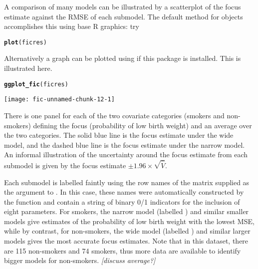 \documentclass[article,shortnames,nojss,nofooter]{jss}\usepackage[]{graphicx}\usepackage[]{color}
\makeatletter
\def\maxwidth{ %
  \ifdim\Gin@nat@width>\linewidth
    \linewidth
  \else
    \Gin@nat@width
  \fi
}
\newcommand{\hlstd}[1]{\textcolor[rgb]{0.345,0.345,0.345}{#1}}%
\newcommand{\hlkwd}[1]{\textcolor[rgb]{0.737,0.353,0.396}{\textbf{#1}}}%
\newenvironment{kframe}{%
 \def\at@end@of@kframe{}%
 \ifinner\ifhmode%
  \def\at@end@of@kframe{\end{minipage}}%
  \begin{minipage}{\columnwidth}%
 \fi\fi%
 \def\FrameCommand##1{\hskip\@totalleftmargin \hskip-\fboxsep
 \colorbox{shadecolor}{##1}\hskip-\fboxsep
     \hskip-\linewidth \hskip-\@totalleftmargin \hskip\columnwidth}%
 \MakeFramed {\advance\hsize-\width
   \@totalleftmargin\z@ \linewidth\hsize
   \@setminipage}}%
 {\par\unskip\endMakeFramed%
 \at@end@of@kframe}
\newenvironment{knitrout}{}{} %
\makeatother
\begin{document}
A comparison of many models can be illustrated by a scatterplot of
the focus estimate against the RMSE of each submodel.  The default
 method for  objects accomplishes this using base
R graphics: try 
\begin{knitrout}
\color{fgcolor}\begin{kframe}
\begin{alltt}
\hlkwd{plot}\hlstd{(ficres)}
\end{alltt}
\end{kframe}
\end{knitrout}
Alternatively a graph can be plotted using  if this
package is installed.   This is illustrated here. 
\begin{knitrout}
\color{fgcolor}\begin{kframe}
\begin{alltt}
\hlkwd{ggplot_fic}\hlstd{(ficres)}
\end{alltt}
\end{kframe}
\texttt{[image: fic-unnamed-chunk-12-1]} 

\end{knitrout}
There is one panel for each of the two covariate categories (smokers and
non-smokers) defining the focus (probability of low birth weight) and
an average over the two categories. 
The solid blue line is the focus estimate under the wide model, and
the dashed blue line is the focus estimate under the narrow model.
 An informal illustration of the uncertainty around the focus estimate from
each submodel is given by the focus estimate $\pm 1.96 \times
\sqrt{\hat{V}}$.  

Each submodel is labelled faintly using the row
names of the matrix supplied as the  argument to
.  In this case, these names were automatically
constructed by the function  and contain a string of binary 0/1 
indicators for the inclusion of eight parameters.
For smokers, the narrow model (labelled ) and similar smaller models give
estimates of the probability of low birth weight with the 
lowest MSE, while by contrast, for non-smokers, the wide model
(labelled ) and similar larger
models gives the most accurate focus estimates.   Note that in this
dataset, there are 115 non-smokers and 74 smokers, thus more data are
available to identify bigger models for non-smokers.    \emph{[discuss
average?]}
\end{document}
